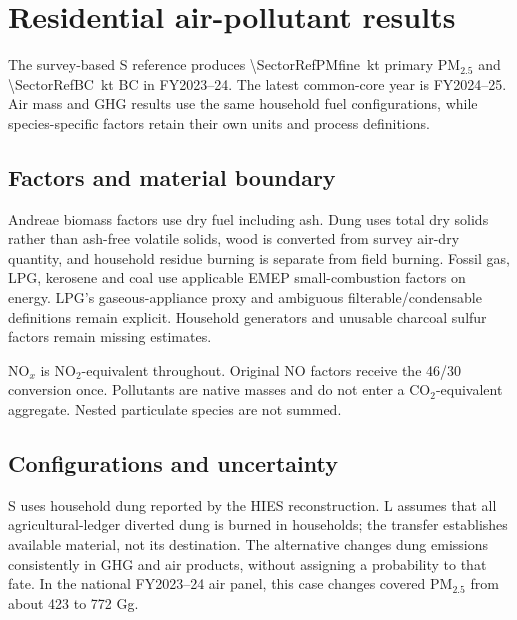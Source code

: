 \section{Residential air-pollutant results}
\label{sec:air}
The survey-based S reference produces \SI{\SectorRefPMfine}{\kilo\tonne} primary PM$_{2.5}$ and \SI{\SectorRefBC}{\kilo\tonne} BC in FY2023--24. The latest common-core year is FY2024--25. Air mass and GHG results use the same household fuel configurations, while species-specific factors retain their own units and process definitions.

\begin{table}[htbp]\centering\small

\caption{Gross appliance emissions under reference S. BC and OC are components of PM$_{2.5}$; PM$_{10}$/TSP have narrower coal-only support.}\label{tab:air}
\end{table}

\subsection{Factors and material boundary}
Andreae biomass factors use dry fuel including ash. Dung uses total dry solids rather than ash-free volatile solids, wood is converted from survey air-dry quantity, and household residue burning is separate from field burning. Fossil gas, LPG, kerosene and coal use applicable EMEP small-combustion factors on energy. LPG's gaseous-appliance proxy and ambiguous filterable/condensable definitions remain explicit. Household generators and unusable charcoal sulfur factors remain missing estimates.

NO$_x$ is NO$_2$-equivalent throughout. Original NO factors receive the 46/30 conversion once. Pollutants are native masses and do not enter a CO$_2$-equivalent aggregate. Nested particulate species are not summed.

\subsection{Configurations and uncertainty}
S uses household dung reported by the HIES reconstruction. L assumes that all agricultural-ledger diverted dung is burned in households; the transfer establishes available material, not its destination. The alternative changes dung emissions consistently in GHG and air products, without assigning a probability to that fate. In the national FY2023--24 air panel, this case changes covered PM$_{2.5}$ from about 423 to 772 Gg.

